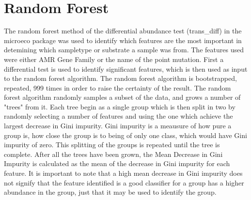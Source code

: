 \section{Random Forest}
The random forest method of the differential abundance test (trans\_diff) in the microeco package\cite{liu2021MicroecoPackageData} was used to identify which features are the most important in detemining which sampletype or substrate a sample was from. 
The features used were either AMR Gene Family  or the name of the point mutation. 
First a differential test is used to identify significant features, which is then used as input to the random forest algorithm. The random forest algorithm is bootstrapped, repeated, 999 times in order to raise the certainty of the result. 
The random forest algorithm randomly samples a subset of the data, and grows a number of "trees" from it. 
Each tree begin as a single group which is then split in two by randomly selecting a number of features and using the one which achieve the largest decrease in Gini impurity. 
Gini impurity is a meausure of how pure a group is, how close the group is to being of only one class, which would have Gini impurity of zero\cite{ClassificationTreeBinaryDecision}. 
This splitting of the groups is repeated until the tree is complete. 
After all the trees have been grown, the Mean Decrease in Gini Impurity is calculated as the mean of the decrease in Gini impurity for each feature.
It is important to note that a high mean decrease in Gini impurity does not signify that the feature identified is a good classifier for a group has a higher abundance in the group, just that it may be used to identify the group. 















